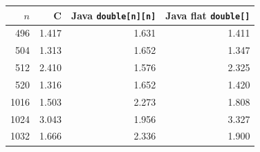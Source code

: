 \begin{tabular}{rrrr}
\toprule
$n$ & C & Java \texttt{double[n][n]} & Java flat \texttt{double[]} \\
\midrule
496 & 1.417 & 1.631 & 1.411 \\
504 & 1.313 & 1.652 & 1.347 \\
512 & 2.410 & 1.576 & 2.325 \\
520 & 1.316 & 1.652 & 1.420 \\
1016 & 1.503 & 2.273 & 1.808 \\
1024 & 3.043 & 1.956 & 3.327 \\
1032 & 1.666 & 2.336 & 1.900 \\
\bottomrule
\end{tabular}
